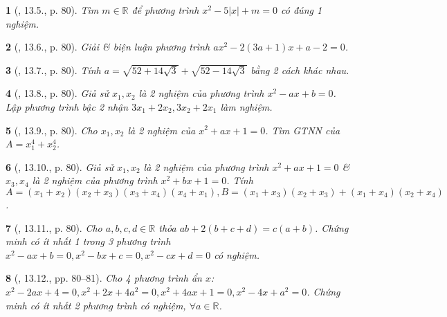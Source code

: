 \documentclass{article}
\newtheorem{baitoan}{}
\begin{document}
\begin{baitoan}[\cite{TLCT_THCS_Toan_9_dai_so}, 13.5., p. 80]
	Tìm $m\in\mathbb{R}$ để phương trình $x^2 - 5|x| + m = 0$ có đúng 1 nghiệm.
\end{baitoan}

\begin{baitoan}[\cite{TLCT_THCS_Toan_9_dai_so}, 13.6., p. 80]
	Giải \& biện luận phương trình $ax^2 - 2(3a + 1)x + a - 2 = 0$.
\end{baitoan}

\begin{baitoan}[\cite{TLCT_THCS_Toan_9_dai_so}, 13.7., p. 80]
	Tính $a = \sqrt{52 + 14\sqrt{3}} + \sqrt{52 - 14\sqrt{3}}$ bằng 2 cách khác nhau.
\end{baitoan}

\begin{baitoan}[\cite{TLCT_THCS_Toan_9_dai_so}, 13.8., p. 80]
	Giả sử $x_1,x_2$ là 2 nghiệm của phương trình $x^2 - ax + b = 0$. Lập phương trình bậc 2 nhận $3x_1 + 2x_2,3x_2 + 2x_1$ làm nghiệm.
\end{baitoan}

\begin{baitoan}[\cite{TLCT_THCS_Toan_9_dai_so}, 13.9., p. 80]
	Cho $x_1,x_2$ là 2 nghiệm của $x^2 + ax + 1 = 0$. Tìm {\rm GTNN} của $A = x_1^4 + x_2^4$.
\end{baitoan}

\begin{baitoan}[\cite{TLCT_THCS_Toan_9_dai_so}, 13.10., p. 80]
	Giả sử $x_1,x_2$ là 2 nghiệm của phương trình $x^2 + ax + 1 = 0$ \& $x_3,x_4$ là 2 nghiệm của phương trình $x^2 + bx + 1 = 0$. Tính $A = (x_1 + x_2)(x_2 + x_3)(x_3 + x_4)(x_4 + x_1),B = (x_1 + x_3)(x_2 + x_3) + (x_1 + x_4)(x_2 + x_4)$.
\end{baitoan}

\begin{baitoan}[\cite{TLCT_THCS_Toan_9_dai_so}, 13.11., p. 80]
	Cho $a,b,c,d\in\mathbb{R}$ thỏa $ab + 2(b + c + d) = c(a + b)$. Chứng minh có ít nhất 1 trong 3 phương trình $x^2 - ax + b = 0,x^2 - bx + c = 0,x^2 - cx + d = 0$ có nghiệm.
\end{baitoan}

\begin{baitoan}[\cite{TLCT_THCS_Toan_9_dai_so}, 13.12., pp. 80--81]
	Cho 4 phương trình ẩn $x$: $x^2 - 2ax + 4 = 0,x^2 + 2x + 4a^2 = 0,x^2 + 4ax + 1 = 0,x^2 - 4x + a^2 = 0$. Chứng minh có ít nhất 2 phương trình có nghiệm, $\forall a\in\mathbb{R}$.
\end{baitoan}
\end{document}
